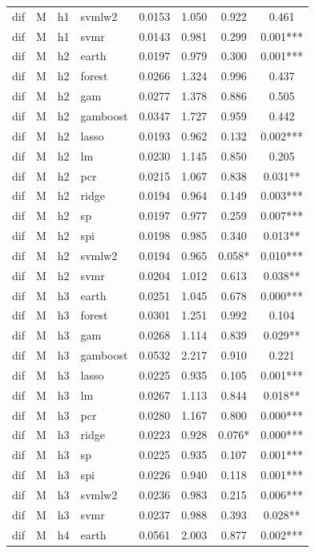 \begin{ThreePartTable}
\begin{longtable}[t]{llclcccc}
dif & M & h1 & svmlw2 & 0.0153 & 1.050 & 0.922 & 0.461\\
dif & M & h1 & svmr & 0.0143 & 0.981 & 0.299 & 0.001***\\
\addlinespace
dif & M & h2 & earth & 0.0197 & 0.979 & 0.300 & 0.001***\\
dif & M & h2 & forest & 0.0266 & 1.324 & 0.996 & 0.437\\
dif & M & h2 & gam & 0.0277 & 1.378 & 0.886 & 0.505\\
dif & M & h2 & gamboost & 0.0347 & 1.727 & 0.959 & 0.442\\
dif & M & h2 & lasso & 0.0193 & 0.962 & 0.132 & 0.002***\\
dif & M & h2 & lm & 0.0230 & 1.145 & 0.850 & 0.205\\
dif & M & h2 & pcr & 0.0215 & 1.067 & 0.838 & 0.031**\\
dif & M & h2 & ridge & 0.0194 & 0.964 & 0.149 & 0.003***\\
dif & M & h2 & sp & 0.0197 & 0.977 & 0.259 & 0.007***\\
dif & M & h2 & spi & 0.0198 & 0.985 & 0.340 & 0.013**\\
dif & M & h2 & svmlw2 & 0.0194 & 0.965 & 0.058* & 0.010***\\
dif & M & h2 & svmr & 0.0204 & 1.012 & 0.613 & 0.038**\\
\addlinespace
dif & M & h3 & earth & 0.0251 & 1.045 & 0.678 & 0.000***\\
dif & M & h3 & forest & 0.0301 & 1.251 & 0.992 & 0.104\\
dif & M & h3 & gam & 0.0268 & 1.114 & 0.839 & 0.029**\\
dif & M & h3 & gamboost & 0.0532 & 2.217 & 0.910 & 0.221\\
dif & M & h3 & lasso & 0.0225 & 0.935 & 0.105 & 0.001***\\
dif & M & h3 & lm & 0.0267 & 1.113 & 0.844 & 0.018**\\
dif & M & h3 & pcr & 0.0280 & 1.167 & 0.800 & 0.000***\\
dif & M & h3 & ridge & 0.0223 & 0.928 & 0.076* & 0.000***\\
dif & M & h3 & sp & 0.0225 & 0.935 & 0.107 & 0.001***\\
dif & M & h3 & spi & 0.0226 & 0.940 & 0.118 & 0.001***\\
dif & M & h3 & svmlw2 & 0.0236 & 0.983 & 0.215 & 0.006***\\
dif & M & h3 & svmr & 0.0237 & 0.988 & 0.393 & 0.028**\\
\addlinespace
dif & M & h4 & earth & 0.0561 & 2.003 & 0.877 & 0.002***\\

\end{longtable}
\end{ThreePartTable}
